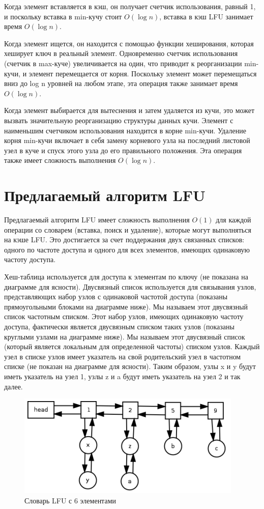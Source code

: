\documentclass[a4paper, 12pt]{article}
\begin{document}
Когда элемент вставляется в кэш, он получает счетчик использования, равный 1, и поскольку вставка в min-кучу стоит $O(\log{n})$, вставка в кэш LFU занимает время $O(\log{n})$.

Когда элемент ищется, он находится с помощью функции хеширования, которая хеширует ключ в реальный элемент. Одновременно счетчик использования (счетчик в max-куче) увеличивается на один, что приводит к реорганизации min-кучи, и элемент перемещается от корня. Поскольку элемент может перемещаться вниз до log n уровней на любом этапе, эта операция также занимает время $O(\log{n})$.

Когда элемент выбирается для вытеснения и затем удаляется из кучи, это может вызвать значительную реорганизацию структуры данных кучи. Элемент с наименьшим счетчиком использования находится в корне min-кучи. Удаление корня min-кучи включает в себя замену корневого узла на последний листовой узел в куче и спуск этого узла до его правильного положения. Эта операция также имеет сложность выполнения $O(\log{n})$.

\section{Предлагаемый алгоритм LFU}

Предлагаемый алгоритм LFU имеет сложность выполнения $O(1)$ для каждой операции со словарем (вставка, поиск и удаление), которые могут выполняться на кэше LFU. Это достигается за счет поддержания двух связанных списков: одного по частоте доступа и одного для всех элементов, имеющих одинаковую частоту доступа.

Хеш-таблица используется для доступа к элементам по ключу (не показана на диаграмме для ясности). Двусвязный список используется для связывания узлов, представляющих набор узлов с одинаковой частотой доступа (показаны прямоугольными блоками на диаграмме ниже). Мы называем этот двусвязный список частотным списком. Этот набор узлов, имеющих одинаковую частоту доступа, фактически является двусвязным списком таких узлов (показаны круглыми узлами на диаграмме ниже). Мы называем этот двусвязный список (который является локальным для определенной частоты) списком узлов. Каждый узел в списке узлов имеет указатель на свой родительский узел в частотном списке (не показан на диаграмме для ясности). Таким образом, узлы x и y будут иметь указатель на узел 1, узлы z и a будут иметь указатель на узел 2 и так далее.

\begin{figure}[ht!]
    \begin{center}
        \includegraphics{6elem.png}
    \end{center}
    \caption{Словарь LFU с 6 элементами}
\end{figure}
\end{document}
